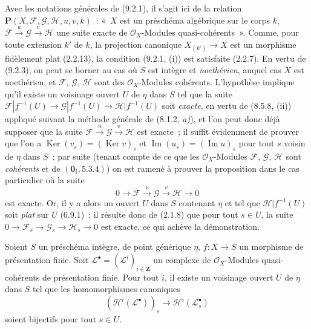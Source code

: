 Avec les notations générales de (9.2.1), il s'agit ici de la relation
$\mathbf P(X,\mathcal F,\mathcal G,\mathcal H,u,v,k)$~: «~$X$ est un
préschéma algébrique sur le corps $k$,
$\mathcal F\xrightarrow{u}\mathcal G\xrightarrow{v}\mathcal H$ une suite
exacte de $\mathcal O_X$-Modules quasi-cohérents~». Comme, pour toute extension
$k'$ de $k$, la projection canonique $X_{(k')}\to X$ est un morphisme
fidèlement plat (2.2.13), la condition (9.2.1, (i)) est satisfaite (2.2.7). En
vertu de (9.2.3), on peut se borner au cas où $S$ est intègre et
\emph{noethérien}, auquel cas $X$ est noethérien, et $\mathcal F$,
$\mathcal G$, $\mathcal H$ sont des $\mathcal O_X$-Modules cohérents.
L'hypothèse implique qu'il existe un voisinage ouvert $U$ de $\eta$ dans $S$
tel que la suite
$\mathcal F|f^{-1}(U)\to\mathcal G|f^{-1}(U)\to\mathcal H|f^{-1}(U)$ soit
\emph{exacte}, en vertu de (8.5.8, (ii)) appliqué suivant la méthode générale
de (8.1.2, \emph{a)}), et l'on peut donc déjà supposer que la suite
$\mathcal F\xrightarrow{u}\mathcal G\xrightarrow{v}\mathcal H$ est exacte~;
il suffit évidemment de prouver que l'on a
$\operatorname{Ker}(v_s)=(\operatorname{Ker}v)_s$ et
$\operatorname{Im}(u_s)=(\operatorname{Im}u)_s$ pour tout $s$ voisin de
$\eta$ dans $S$~; par suite (tenant compte de ce que les
$\mathcal O_X$-Modules $\mathcal F$, $\mathcal G$, $\mathcal H$ sont
\emph{cohérents} et de $(\mathbf 0_{\mathrm I},5.3.4)$) on est ramené à
prouver la proposition dans le cas particulier où la suite
\[
0\to\mathcal F\xrightarrow{u}\mathcal G\xrightarrow{v}\mathcal H\to0
\]
est exacte. Or, il y a alors un ouvert $U$ dans $S$ contenant $\eta$ et tel
que $\mathcal H|f^{-1}(U)$ soit \emph{plat} sur $U$ (6.9.1)~; il résulte donc
de (2.1.8) que pour tout $s\in U$, la suite
$0\to\mathcal F_s\to\mathcal G_s\to\mathcal H_s\to0$ est exacte, ce qui
achève la démonstration.

\begin{corollary}[9.4.3]
\label{IV.9.4.3-fr}
Soient $S$ un préschéma intègre, de point générique $\eta$, $f:X\to S$ un
morphisme de présentation finie. Soit
$\mathcal L^\bullet=(\mathcal L^i)_{i\in\mathbf Z}$ un complexe de
$\mathcal O_X$-Modules quasi-cohérents de présentation finie. Pour tout $i$,
il existe un voisinage ouvert $U$ de $\eta$ dans $S$ tel que les homomorphismes
canoniques
\begin{equation}
\label{IV.9.4.3.1-fr}
(\mathcal H^i(\mathcal L^\bullet))_s\to
\mathcal H^i(\mathcal L_s^\bullet) \tag{9.4.3.1}
\end{equation}
soient bijectifs pour tout $s\in U$.
\end{corollary}

